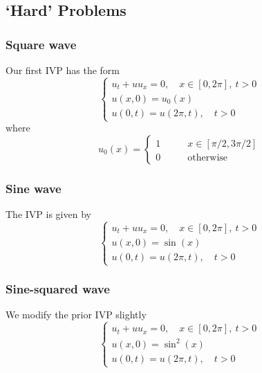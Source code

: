 \documentclass{myproject}
\begin{document}
\subsection{`Hard' Problems}

\subsubsection{Square wave}

Our first IVP has the form
\begin{equation}
    \begin{cases}
        u_t + uu_x = 0, \quad x \in [0, 2\pi], \: t>0 \\
        u(x,0) = u_0(x) \\
        u(0,t) = u(2\pi,t), \quad t > 0
    \end{cases}
\end{equation}
where
\begin{equation}
    u_0(x) = 
    \begin{cases}
        1 \qquad &  x \in [\pi/2, 3\pi/2] \\
        0 \qquad & \text{otherwise} 
    \end{cases}
\end{equation}

\subsubsection{Sine wave}

The IVP is given by
\begin{equation}
    \begin{cases}
        u_t + uu_x = 0, \quad x \in [0, 2\pi], \: t>0 \\
        u(x,0) = \sin(x) \\
        u(0,t) = u(2\pi,t), \quad t > 0
    \end{cases}
\end{equation}

\subsubsection{Sine-squared wave}

We modify the prior IVP slightly
\begin{equation}
    \begin{cases}
        u_t + uu_x = 0, \quad x \in [0, 2\pi], \: t>0 \\
        u(x,0) = \sin^2(x) \\
        u(0,t) = u(2\pi,t), \quad t > 0
    \end{cases}
\end{equation}
\end{document}
